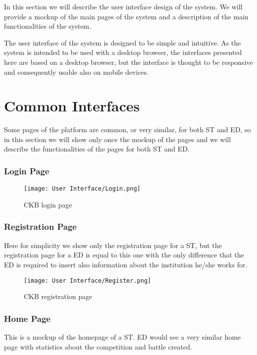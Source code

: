 %
In this section we will describe the user interface design of the system. We will provide a mockup of the main pages of the system and a description of the main functionalities of the system.

The user interface of the system is designed to be simple and intuitive. As the system is intended to be used with a desktop browser, the interfaces presented here are based on a desktop browser, but the interface is thought to be responsive and consequently usable also on mobile devices.

\section*{Common Interfaces}
\label{s:common_interface}%
Some pages of the platform are common, or very similar, for both ST and ED, so in this section we will show only once the mockup of the pages and we will describe the functionalities of the pages for both ST and ED.

\subsubsection*{Login Page}
\label{ss:login}%

\begin{figure}[H]
  \centering
  \texttt{[image: User Interface/Login.png]}
  \caption{CKB login page}
  \label{fig:login}
\end{figure}

\newpage

\subsubsection*{Registration Page}
\label{ss:registration}%
Here for simplicity we show only the registration page for a ST, but the registration page for a ED is equal to this one with the only difference that the ED is required to insert also information about the institution he/she works for.

\begin{figure}[H]
  \centering
  \texttt{[image: User Interface/Register.png]}
  \caption{CKB registration page}
  \label{fig:registration}
\end{figure}

\newpage

\subsubsection*{Home Page}
\label{ss:home_page}%
This is a mockup of the homepage of a ST. ED would see a very similar home page with statistics about the competition and battle created.

